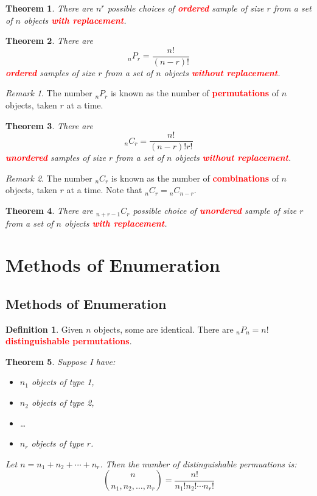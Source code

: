 \documentclass{article}
\newcommand{\bfred}[1]{\textcolor{red}{\textbf{#1}}}
\theoremstyle{plain}
\newtheorem{thm}{Theorem}[section]
\theoremstyle{definition}
\newtheorem{defn}{Definition}[section]
\theoremstyle{remark}
\newtheorem*{rem}{Remark}
\begin{document}
\begin{thm}
    There are $n^r$ possible choices of \bfred{ordered} sample of size $r$ from a set of $n$ objects \bfred{with replacement}.
\end{thm}

\begin{thm}
    There are \[{}_nP_r = \frac{n!}{(n-r)!}\] \bfred{ordered} samples of size $r$ from a set of $n$ objects \bfred{without replacement}.
\end{thm}

\begin{rem}
    The number ${}_nP_r$ is known as the number of \bfred{permutations} of $n$ objects, taken $r$ at a time.
\end{rem}

\begin{thm}
    There are \[{}_nC_r = \frac{n!}{(n-r)!r!}\] \bfred{unordered} samples of size $r$ from a set of $n$ objects \bfred{without replacement}.
\end{thm}

\begin{rem}
    The number ${}_nC_r$ is known as the number of \bfred{combinations} of $n$ objects, taken $r$ at a time. Note that ${}_nC_r = {}_nC_{n-r}$.
\end{rem}

\begin{thm}
    There are ${}_{n+r-1}C_r$ possible choice of \bfred{unordered} sample of size $r$ from a set of $n$ objects \bfred{with replacement}.
\end{thm}

\section{Methods of Enumeration}
\subsection{Methods of Enumeration}

\begin{defn}
    Given $n$ objects, some are identical. There are ${}_nP_n = n!$ \bfred{distinguishable permutations}.
\end{defn}

\begin{thm}
    Suppose I have:
    \begin{itemize}
        \item $n_1$ objects of type 1,
        \item $n_2$ objects of type 2,
        \item \ldots
        \item $n_r$ objects of type $r$.
    \end{itemize}

    Let $n = n_1 + n_2 + \dotsb + n_r$. Then the number of distinguishable permuations is: \[\binom{n}{n_1, n_2, \dotsc, n_r} = \frac{n!}{n_1!n_2! \dotsm n_r!}\]
\end{thm}
\end{document}
